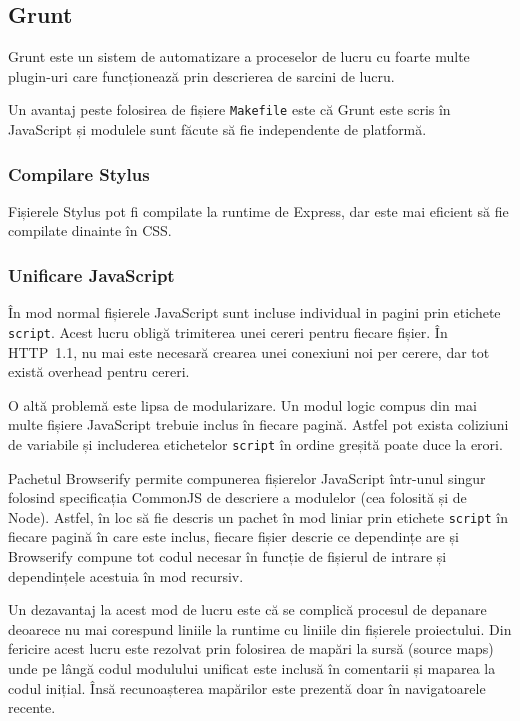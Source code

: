 \documentclass[a4wide,12pt]{report}
\newcommand{\eng}[1]{{#1}} %
\newcommand{\cod}[1]{\texttt{#1}}
\begin{document}
\subsection{Grunt}

Grunt este un sistem de automatizare a proceselor de lucru cu foarte multe
\eng{plugin}-uri care funcționează prin descrierea de sarcini de lucru.

Un avantaj peste folosirea de fișiere \cod{Makefile} este că Grunt este scris în
JavaScript și modulele sunt făcute să fie independente de platformă.

\subsubsection{Compilare Stylus}

Fișierele Stylus pot fi compilate la \eng{runtime} de Express, dar este mai
eficient să fie compilate dinainte în CSS.

\subsubsection{Unificare JavaScript}

În mod normal fișierele JavaScript sunt incluse individual in pagini prin
etichete \cod{script}. Acest lucru obligă trimiterea unei cereri pentru fiecare
fișier. În HTTP~1.1, nu mai este necesară crearea unei conexiuni noi per
cerere, dar tot există \eng{overhead} pentru cereri.

O altă problemă este lipsa de modularizare. Un modul logic compus din mai multe
fișiere JavaScript trebuie inclus în fiecare pagină. Astfel pot exista coliziuni
de variabile și includerea etichetelor \cod{script} în ordine greșită poate duce
la erori.

Pachetul Browserify permite compunerea fișierelor JavaScript într-unul singur
folosind specificația CommonJS de descriere a modulelor (cea folosită și de
Node). Astfel, în loc să fie descris un pachet în mod liniar prin etichete
\cod{script} în fiecare pagină în care este inclus, fiecare fișier descrie ce
dependințe are și Browserify compune tot codul necesar în funcție de fișierul de
intrare și dependințele acestuia în mod recursiv.

Un dezavantaj la acest mod de lucru este că se complică procesul de depanare
deoarece nu mai corespund liniile la \eng{runtime} cu liniile din fișierele
proiectului. Din fericire acest lucru este rezolvat prin folosirea de mapări la
sursă (\eng{source maps}) unde pe lângă codul modulului unificat este inclusă în
comentarii și maparea la codul inițial. Însă recunoașterea mapărilor este
prezentă doar în navigatoarele recente.
\end{document}
